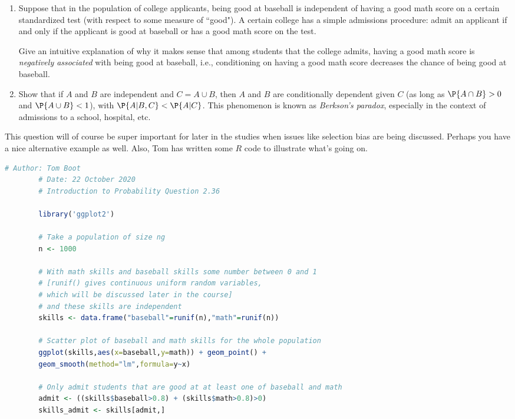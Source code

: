 

\setcounter{theorem}{17}
\begin{exercise}[BH.2.18]
	\begin{enumerate}
		\item Suppose that in the population of college applicants, being good at baseball is independent of having a good math score on a certain standardized test (with respect to some measure of ``good"). A certain college has a simple admissions procedure: admit an applicant if and only if the applicant is good at baseball or has a good math score on the test.
	
		Give an intuitive explanation of why it makes sense that among students that the college admits, having a good math score is \emph{negatively associated} with being good at baseball, i.e., conditioning on having a good math score decreases the chance of being good at baseball.
		\item Show that if $A$ and $B$ are independent and $C = A \cup B$, then $A$ and $B$ are conditionally dependent given $C$ (as long as $\P{A \cap B} > 0$ and $\P{A \cup B} < 1$), with $\P{A|B, C} < \P{A|C}$. This phenomenon is known as \emph{Berkson's paradox}, especially in the context of admissions to a school, hospital, etc.
	\end{enumerate}
\begin{solution}
	This question will of course be super important for later in the studies when issues like selection bias are being discussed. Perhaps you have a nice alternative example as well. Also, Tom has written some $R$ code to illustrate what's going on.
	{\scriptsize \begin{lstlisting}[language=R]
		# Author: Tom Boot
		# Date: 22 October 2020
		# Introduction to Probability Question 2.36
		
		library('ggplot2')
		
		# Take a population of size ng
		n <- 1000
		
		# With math skills and baseball skills some number between 0 and 1
		# [runif() gives continuous uniform random variables, 
		# which will be discussed later in the course]
		# and these skills are independent
		skills <- data.frame("baseball"=runif(n),"math"=runif(n))
		
		# Scatter plot of baseball and math skills for the whole population
		ggplot(skills,aes(x=baseball,y=math)) + geom_point() + 
		geom_smooth(method="lm",formula=y~x)
		
		# Only admit students that are good at at least one of baseball and math
		admit <- ((skills$baseball>0.8) + (skills$math>0.8)>0)
		skills_admit <- skills[admit,]
		

\end{lstlisting}}
\end{solution}
\end{exercise}
